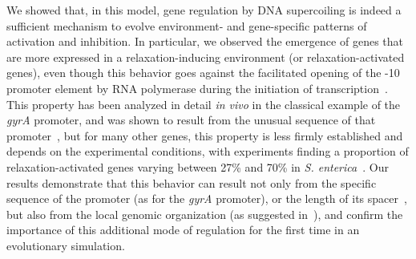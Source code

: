 We showed that, in this model, gene regulation by DNA supercoiling is indeed a sufficient mechanism to evolve environment- and gene-specific patterns of activation and inhibition.
In particular, we observed the emergence of genes that are more expressed in a relaxation-inducing environment (or relaxation-activated genes), even though this behavior goes against the facilitated opening of the -10 promoter element by RNA polymerase during the initiation of transcription~\citep{forquet2021}.
This property has been analyzed in detail \emph{in vivo} in the classical example of the \emph{gyrA} promoter, and was shown to result from the unusual sequence of that promoter~\citep{menzel1987}, but for many other genes, this property is less firmly established and depends on the experimental conditions, with experiments finding a proportion of relaxation-activated genes varying between 27\% and 70\% in \emph{S. enterica}~\citep{pineau2022a}.
Our results demonstrate that this behavior can result not only from the specific sequence of the promoter (as for the \emph{gyrA} promoter), or the length of its spacer~\citep{forquet2022}, but also from the local genomic organization (as suggested in~\cite{elhoudaigui2019}), and confirm the importance of this additional mode of regulation for the first time in an evolutionary simulation.


